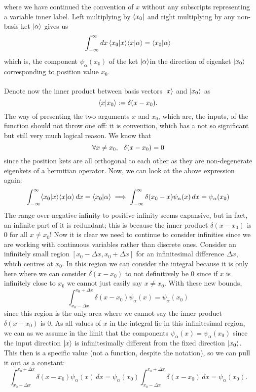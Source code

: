 where we have continued the convention of $x$ without any subscripts representing a variable inner label. Left multiplying by $\langle x_{0}|$ and right multiplying by any non-basis ket $|\alpha\rangle$ gives us
$$
\int_{-\infty}^{\infty} dx\,\langle x_{0}|x\rangle\langle x|\alpha\rangle=\langle x_{0}|\alpha\rangle
$$
which is, the component $\psi_{\alpha}(x_{0})$ of the ket $|\alpha\rangle$in the direction of eigenket $|x_{0}\rangle$ corresponding to position value $x_{0}$.
\\\\
Denote now the inner product between basis vectors $|x\rangle$ and $|x_{0}\rangle$ as $$\langle x|x_{0}\rangle:=
\delta(x-x_{0}).$$ The way of presenting the two arguments $x$ and $x_{0}$, which are, the inputs,
of the function should not throw one off: it is convention, which has a not so significant but still very much logical reason. We know that 
$$
\forall x\neq x_{0}, \:\:\: \delta(x-x_{0})=0 
$$
since the position kets are all orthogonal to each other as they are non-degenerate eigenkets of a hermitian operator. Now, we can look at the above expression again:
$$
\int_{-\infty}^{\infty} \langle x_{0}|x\rangle\langle x|\alpha\rangle\,dx=\langle x_{0}|\alpha\rangle\implies \int_{-\infty}^{\infty} \delta(x_{0}-x)\psi_{\alpha}(x)\,dx=\psi_{\alpha}(x_{0})
$$
The range over negative infinity to positive infinity seems expansive, but in fact, an infinite part of it is redundant; this is because the inner product $\delta(x-x_{0})$ is 0 for all $x\neq x_{0}$! Now it is clear we need to continue to consider infinities since we are working with continuous variables rather than discrete ones. Consider an infinitely small region $[x_{0}-\Delta x,x_{0}+\Delta x]$ for an infinitesimal difference $\Delta x$, which centres at $x_{0}$. In this region we can consider the integral because it is only here where we can consider $\delta(x-x_{0})$ to not definitively be $0$ since if $x$ is infinitely close to $x_{0}$ we cannot just easily say $x\neq x_{0}$. With these new bounds, 
$$
\int_{x_{0}-\Delta x}^{x_{0}+\Delta x}\delta(x-x_{0})\psi_{\alpha}(x)=\psi_{\alpha}(x_{0})
$$
since this region is the only area where we cannot say the inner product $\delta(x-x_{0})$ is $0$. As all values of $x$ in the integral lie in this infinitesimal region, we can as we assume in the limit that the components $\psi_{\alpha}(x)=\psi_{\alpha}(x_{0})$ since the input direction $|x\rangle$ is infinitesimally different from the fixed direction $|x_{0}\rangle$. This then is a specific value (not a function, despite the notation), so we can pull it out as a constant:
$$
\int_{x_{0}-\Delta x}^{x_{0}+\Delta x}\delta(x-x_{0})\psi_{\alpha}(x)\,dx=\psi_{\alpha}(x_{0})\int_{x_{0}-\Delta x}^{x_{0}+\Delta x}\delta(x-x_{0})\,dx=\psi_{\alpha}(x_{0}).
$$
